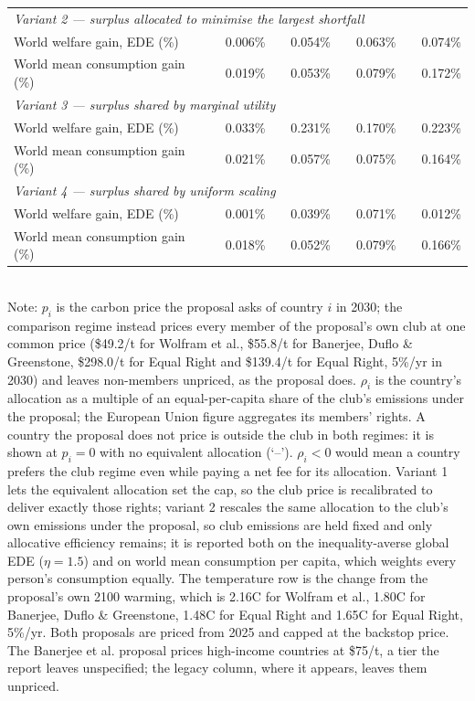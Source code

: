 \begin{table}[htbp]
\begin{tabular}{lcccccccc}
  \midrule
  \multicolumn{9}{l}{\textit{Variant 2 --- surplus allocated to minimise the largest shortfall}} \\
  \quad World welfare gain, EDE (\%) &  & 0.006\% &  & 0.054\% &  & 0.063\% &  & 0.074\% \\
  \quad World mean consumption gain (\%) &  & 0.019\% &  & 0.053\% &  & 0.079\% &  & 0.172\% \\
  \midrule
  \multicolumn{9}{l}{\textit{Variant 3 --- surplus shared by marginal utility}} \\
  \quad World welfare gain, EDE (\%) &  & 0.033\% &  & 0.231\% &  & 0.170\% &  & 0.223\% \\
  \quad World mean consumption gain (\%) &  & 0.021\% &  & 0.057\% &  & 0.075\% &  & 0.164\% \\
  \midrule
  \multicolumn{9}{l}{\textit{Variant 4 --- surplus shared by uniform scaling}} \\
  \quad World welfare gain, EDE (\%) &  & 0.001\% &  & 0.039\% &  & 0.071\% &  & 0.012\% \\
  \quad World mean consumption gain (\%) &  & 0.018\% &  & 0.052\% &  & 0.079\% &  & 0.166\% \\
  \bottomrule
\end{tabular}
\label{tab:equiv_rights_B}
\\[4pt]
{\footnotesize Note: $p_i$ is the carbon price the proposal asks of country $i$ in 2030; the comparison regime instead prices every member of the proposal's own club at one common price (\$49.2/t for Wolfram et al., \$55.8/t for Banerjee, Duflo \& Greenstone, \$298.0/t for Equal Right and \$139.4/t for Equal Right, 5\%/yr in 2030) and leaves non-members unpriced, as the proposal does. $\rho_i$ is the country's allocation as a multiple of an equal-per-capita share of the club's emissions under the proposal; the European Union figure aggregates its members' rights. A country the proposal does not price is outside the club in both regimes: it is shown at $p_i=0$ with no equivalent allocation (`--'). $\rho_i < 0$ would mean a country prefers the club regime even while paying a net fee for its allocation. Variant 1 lets the equivalent allocation set the cap, so the club price is recalibrated to deliver exactly those rights; variant 2 rescales the same allocation to the club's own emissions under the proposal, so club emissions are held fixed and only allocative efficiency remains; it is reported both on the inequality-averse global EDE ($\eta=1.5$) and on world mean consumption per capita, which weights every person's consumption equally. The temperature row is the change from the proposal's own 2100 warming, which is 2.16\textdegree{}C for Wolfram et al., 1.80\textdegree{}C for Banerjee, Duflo \& Greenstone, 1.48\textdegree{}C for Equal Right and 1.65\textdegree{}C for Equal Right, 5\%/yr. Both proposals are priced from 2025 and capped at the backstop price. The Banerjee et al. proposal prices high-income countries at \$75/t, a tier the report leaves unspecified; the legacy column, where it appears, leaves them unpriced.}
\end{table}
